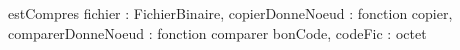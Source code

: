 

\begin{algorithme}
\fonction
{estCompres}
{fichier : FichierBinaire, copierDonneNoeud : fonction copier, comparerDonneNoeud : fonction comparer}
{\entier}
{bonCode, codeFic : octet}
{
}

\end{algorithme}
